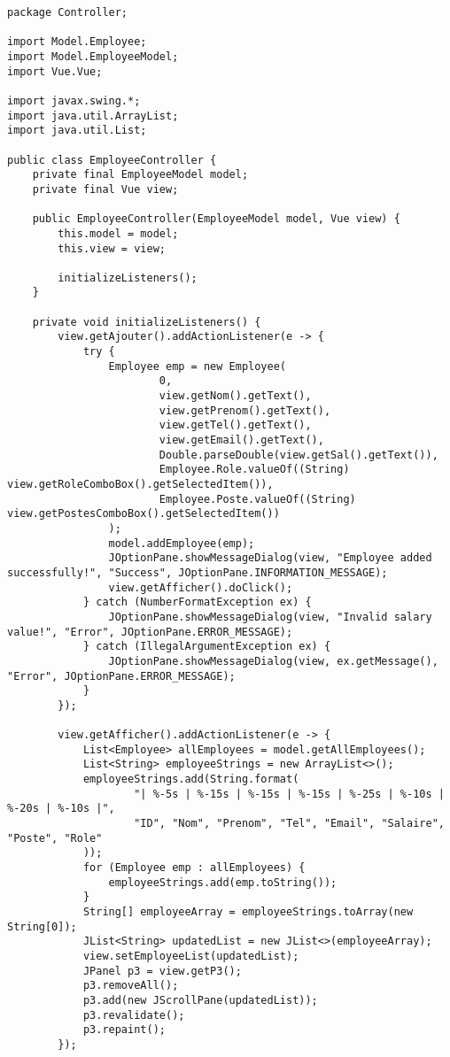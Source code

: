 \documentclass[12pt,a4paper]{article}
\begin{document}
\begin{lstlisting}
package Controller;

import Model.Employee;
import Model.EmployeeModel;
import Vue.Vue;

import javax.swing.*;
import java.util.ArrayList;
import java.util.List;

public class EmployeeController {
    private final EmployeeModel model;
    private final Vue view;

    public EmployeeController(EmployeeModel model, Vue view) {
        this.model = model;
        this.view = view;

        initializeListeners();
    }

    private void initializeListeners() {
        view.getAjouter().addActionListener(e -> {
            try {
                Employee emp = new Employee(
                        0,
                        view.getNom().getText(),
                        view.getPrenom().getText(),
                        view.getTel().getText(),
                        view.getEmail().getText(),
                        Double.parseDouble(view.getSal().getText()),
                        Employee.Role.valueOf((String) view.getRoleComboBox().getSelectedItem()),
                        Employee.Poste.valueOf((String) view.getPostesComboBox().getSelectedItem())
                );
                model.addEmployee(emp);
                JOptionPane.showMessageDialog(view, "Employee added successfully!", "Success", JOptionPane.INFORMATION_MESSAGE);
                view.getAfficher().doClick();
            } catch (NumberFormatException ex) {
                JOptionPane.showMessageDialog(view, "Invalid salary value!", "Error", JOptionPane.ERROR_MESSAGE);
            } catch (IllegalArgumentException ex) {
                JOptionPane.showMessageDialog(view, ex.getMessage(), "Error", JOptionPane.ERROR_MESSAGE);
            }
        });

        view.getAfficher().addActionListener(e -> {
            List<Employee> allEmployees = model.getAllEmployees();
            List<String> employeeStrings = new ArrayList<>();
            employeeStrings.add(String.format(
                    "| %-5s | %-15s | %-15s | %-15s | %-25s | %-10s | %-20s | %-10s |",
                    "ID", "Nom", "Prenom", "Tel", "Email", "Salaire", "Poste", "Role"
            ));
            for (Employee emp : allEmployees) {
                employeeStrings.add(emp.toString());
            }
            String[] employeeArray = employeeStrings.toArray(new String[0]);
            JList<String> updatedList = new JList<>(employeeArray);
            view.setEmployeeList(updatedList);
            JPanel p3 = view.getP3();
            p3.removeAll();
            p3.add(new JScrollPane(updatedList));
            p3.revalidate();
            p3.repaint();
        });


\end{lstlisting}
\end{document}

